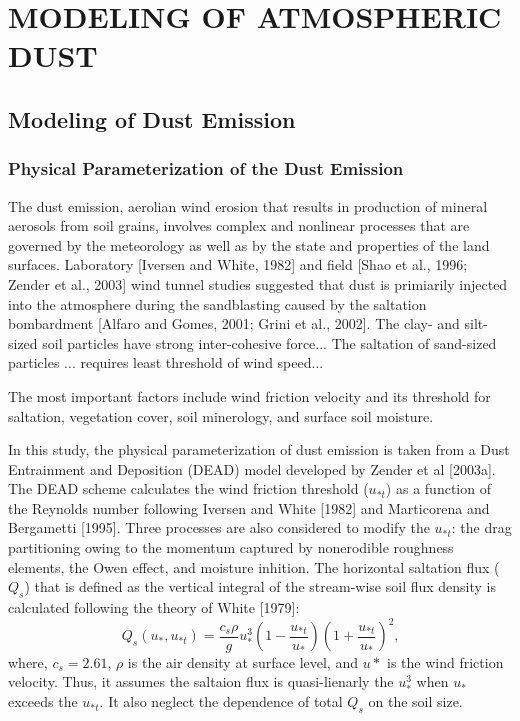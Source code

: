 \chapter{MODELING OF ATMOSPHERIC DUST}

\section{Modeling of Dust Emission}

\subsection{Physical Parameterization of the Dust Emission}

  The dust emission, aerolian wind erosion that results in production of mineral aerosols
  from soil grains, involves complex and nonlinear processes that are governed by the 
  meteorology as well as by the state and properties of the land surfaces. Laboratory 
  [Iversen and White, 1982] and field [Shao et al., 1996; Zender et al., 2003] wind tunnel
  studies suggested that dust is primiarily injected into the atmosphere during the 
  sandblasting caused by the saltation bombardment [Alfaro and Gomes, 2001; Grini et al.,
  2002]. The clay- and silt-sized soil particles have strong inter-cohesive force... 
  The saltation of sand-sized particles ... requires least threshold of wind speed...


  The most important factors include wind friction velocity and its threshold for 
  saltation, vegetation cover, soil minerology, and surface soil moisture. 

  In this study, the physical parameterization of dust emission is taken from a Dust 
  Entrainment and Deposition (DEAD) model developed by Zender et al [2003a]. The DEAD scheme
  calculates the wind friction threshold ($u_{*t}$) as a function of the Reynolds number 
  following Iversen and White [1982] and Marticorena and Bergametti [1995]. Three processes 
  are also considered to modify the $u_{*t}$: the drag partitioning owing to the momentum 
  captured by nonerodible roughness elements, the Owen effect, and moisture inhition. The 
  horizontal saltation flux ($Q_s$) that is defined as the vertical integral of the 
  stream-wise soil flux density is calculated following the theory of White [1979]:
  \begin{equation}
  Q_s(u_*,u_{*t}) = \frac{c_s \rho}{g} u_*^3
        \left(1-\frac{u_{*t}}{u_*}\right)
        \left(1+\frac{u_{*t}}{u_*}\right)^2 \mbox{,}
  \end{equation}
  where, $c_s=2.61$, $\rho$ is the air density at surface level, and $u*$ is the wind 
  friction velocity. Thus, it assumes the saltaion flux is quasi-lienarly the $u_*^3$ when
  $u_*$ exceeds the $u_{*t}$. It also neglect the dependence of total $Q_s$ on the soil size. 

